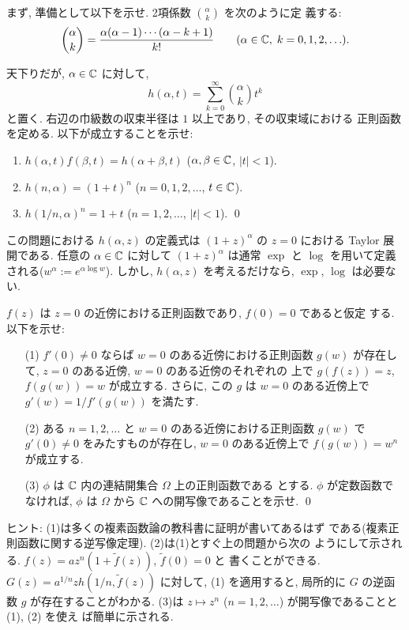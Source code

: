 \documentclass[12pt,twoside]{jarticle}
\def\C{{\Bbb C}} %
\begin{document}
まず, 準備として以下を示せ. 2項係数 $\alpha \choose k$ を次のように定
義する:
\[
  {\alpha \choose k} =
  \frac{\alpha(\alpha - 1)\cdots(\alpha - k +1)}{k!}
  \qquad
  (\alpha\in\C,\; k=0,1,2,\ldots).
\]

\begin{question}
  天下りだが, $\alpha\in\C$ に対して,
  \[
    h(\alpha,t) = \sum_{k=0}^\infty {\alpha \choose k} t^k
  \]
  と置く. 右辺の巾級数の収束半径は $1$ 以上であり, その収束域における
  正則函数を定める. 以下が成立することを示せ:
  \begin{enumerate}
  \item $h(\alpha,t)f(\beta,t) = h(\alpha+\beta,t)$ \quad
    ($\alpha,\beta\in\C$, $|t|<1$).
  \item $h(n,\alpha) = (1 + t)^n$ \quad
    ($n=0,1,2,\ldots$, $t\in\C$).
  \item $h(1/n,\alpha)^n = 1 + t$ \quad
    ($n=1,2,\ldots$, $|t|<1$).
    \qed
  \end{enumerate}
\end{question}

\noindent この問題における $h(\alpha,z)$ の定義式は %
$(1 + z)^\alpha$ の $z=0$ における Taylor 展開である. %
任意の $\alpha\in\C$ に対して $(1+z)^\alpha$ は通常 $\exp$ と $\log$ 
を用いて定義される($w^\alpha := e^{\alpha\log w}$). しかし, %
$h(\alpha,z)$ を考えるだけなら, $\exp$, $\log$ は必要ない.

\begin{question}
  $f(z)$ は $z=0$ の近傍における正則函数であり, $f(0)=0$ であると仮定
  する. 以下を示せ:
  \begin{enumerate}
  \item[(1)] $f'(0)\ne 0$ ならば $w=0$ のある近傍における正則函数 %
    $g(w)$ が存在して, $z=0$ のある近傍, $w=0$ のある近傍のそれぞれの
    上で $g(f(z))=z$, $f(g(w)) = w$ が成立する. さらに, この $g$ は %
    $w=0$ のある近傍上で $g'(w) = 1/f'(g(w))$ を満たす.
  \item[(2)] ある $n=1,2,\ldots$ と $w=0$ のある近傍における正則函数 %
    $g(w)$ で $g'(0)\ne0$ をみたすものが存在し, $w=0$ のある近傍上で %
    $f(g(w))=w^n$ が成立する.
  \item[(3)] $\phi$ は $\C$ 内の連結開集合 $\Omega$ 上の正則函数である
    とする. $\phi$ が定数函数でなければ, $\phi$ は $\Omega$ から $\C$ 
    への開写像であることを示せ.  \qed
  \end{enumerate}
\end{question}

\noindent ヒント: (1)は多くの複素函数論の教科書に証明が書いてあるはず
である(複素正則函数に関する逆写像定理). (2)は(1)とすぐ上の問題から次の
ようにして示される. $f(z)= a z^n(1+\tilde{f}(z))$, $\tilde{f}(0)=0$ と
書くことができる. $G(z) = a^{1/n} z h(1/n,\tilde{f}(z))$ に対して, (1)
を適用すると, 局所的に $G$ の逆函数 $g$ が存在することがわかる. (3)は %
$z \mapsto z^n$ ($n=1,2,\ldots$) が開写像であることと (1), (2) を使え
ば簡単に示される. 
\end{document}
